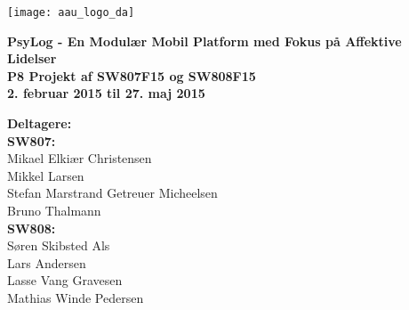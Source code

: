 \hspace*{-1cm}\parbox[b][\textheight][t]{\textwidth}
{

\begin{center}
	\texttt{[image: aau\_logo\_da]}\\
	\vspace{0.25cm}
\end{center} 

\vspace{1cm}
\begin{center}

\textbf{\Huge {PsyLog - En Modulær Mobil Platform med Fokus på Affektive Lidelser}} \\ \vspace{0.5cm}
\textbf{\Large P8 Projekt af SW807F15 og SW808F15}\\ \vspace{0.5cm}
\textbf{\large 2. februar 2015 til 27. maj 2015}\\
\end{center}



\vspace{0.25cm}
\begin{center}
\item {\textbf{Deltagere:}} \\
\textbf{SW807:}\\
Mikael Elkiær Christensen\\
Mikkel Larsen\\
Stefan Marstrand Getreuer Micheelsen\\
Bruno Thalmann\\[0.2cm]
\textbf{SW808:}\\
Søren Skibsted Als\\
Lars Andersen\\
Lasse Vang Gravesen\\
Mathias Winde Pedersen

\end{center}

\thispagestyle{empty}

\newpage
\thispagestyle{empty}
\mbox{}
}